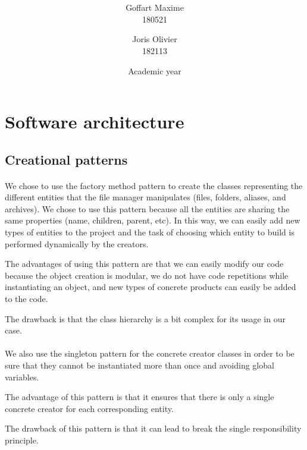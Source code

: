 \documentclass[a4paper, 11pt, oneside]{article}
\title{\ClassName\\\vspace*{0.8cm}\ProjectName\vspace{0.8cm}}
\author{Goffart Maxime \\180521 \and Joris Olivier \\ 182113}
\date{\vspace{1cm}Academic year \AcademicYear}
\begin{document}
\begin{titlingpage}
{\let\newpage\relax\maketitle}
\end{titlingpage}


\section{Software architecture}

\subsection{Creational patterns}

\paragraph{}We chose to use the factory method pattern to create the classes representing the different entities that the file manager manipulates (files, folders, aliases, and archives).
We chose to use this pattern because all the entities are sharing the same properties (name, children, parent, etc). In this way,  we can easily add new types of entities to the project and the task of choosing which entity to build is performed dynamically by the creators.

The advantages of using this pattern are that we can easily modify our code because the object creation is modular, we do not have code repetitions while instantiating an object, and new types of concrete products can easily be added to the code.

The drawback is that the class hierarchy is a bit complex for its usage in our case.

\paragraph{}We also use the singleton pattern for the concrete creator classes in order to be sure that they cannot be instantiated more than once and avoiding global variables.

The advantage of this pattern is that it ensures that there is only a single concrete creator for each corresponding entity.

The drawback of this pattern is that it can lead to break the single responsibility principle.
\end{document}
